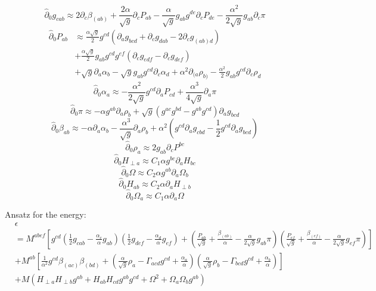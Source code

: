 \documentclass{article}
\begin{document}
\[
{\hat \partial}_{0}g_{cab} \approx 2\partial_{c}\beta_{(ab)} + \frac{2\alpha}{\sqrt{g}}\partial_{c}P_{ab} - \frac{\alpha}{\sqrt{g}}g_{ab}g^{de}\partial_{c}P_{de} - \frac{\alpha^2}{2\sqrt{g}}g_{ab}\partial_{c}\pi
\]
\begin{align*}
{\hat \partial}_{0}P_{ab} & \approx \frac{\alpha\sqrt{g}}{2}g^{cd}\left(\partial_{a}g_{bcd} + \partial_{c}g_{dab} - 2\partial_{c}g_{(ab)d}\right)\\
& + \frac{\alpha\sqrt{g}}{2}g_{ab}g^{cd}g^{ef}\left(\partial_{c}g_{edf} - \partial_{c}g_{def}\right)\\
& + \sqrt{g}\partial_{a}\alpha_{b} - \sqrt{g}g_{ab}g^{cd}\partial_{c}\alpha_{d} + \alpha^{2}\partial_{(a}\rho_{b)} - \frac{\alpha^2}{2}g_{ab}g^{cd}\partial_{c}\rho_{d} 
\end{align*}
\[
{\hat \partial}_{0}\alpha_{a} \approx - \frac{\alpha^{2}}{2\sqrt{g}}g^{cd}\partial_{a}P_{cd} + \frac{\alpha^{3}}{4\sqrt{g}}\partial_{a}\pi
\]
\[
{\hat \partial}_{0}\pi \approx -\alpha g^{ab}\partial_{a}\rho_{b} + \sqrt{g}\left(g^{ac}g^{bd} - g^{ab}g^{cd}\right)\partial_{a}g_{bcd}
\]
\[
{\hat \partial}_{0}\beta_{ab} \approx - \alpha \partial_{a}\alpha_{b} - \frac{\alpha^{3}}{\sqrt{g}}\partial_{a}\rho_{b} + \alpha^{2}\left(g^{cd}\partial_{a}g_{cbd} - \frac{1}{2}g^{cd}\partial_{a}g_{bcd}\right)
\]
\[
{\hat \partial}_{0}\rho_{a} \approx 2g_{ab}\partial_{c}P^{bc}
\]
\[
{\hat \partial}_{0}H_{\perp a} \approx C_{1}\alpha g^{bc}\partial_{a}H_{bc}
\]
\[
{\hat \partial}_{0}\Omega \approx C_{2}\alpha g^{ab}\partial_{a}\Omega_{b}
\]
\[
{\hat \partial}_{0}H_{ab} \approx C_{2}\alpha \partial_{a}H_{\perp b}
\]
\[
{\hat \partial}_{0}\Omega_{a} \approx C_{1}\alpha \partial_{a}\Omega
\]

Ansatz for the energy: 
\begin{align*}
& \epsilon \\
& = M^{abef}\left[g^{cd}\left(\frac{1}{2}g_{cab} - \frac{\alpha_{c}}{\alpha}g_{ab}\right)\left(\frac{1}{2}g_{def} - \frac{\alpha_{d}}{\alpha}g_{ef}\right) + \left(\frac{P_{ab}}{\sqrt{g}} + \frac{\beta_{(ab)}}{\alpha} - \frac{\alpha}{2\sqrt{g}}g_{ab}\pi \right)\left(\frac{P_{ef}}{\sqrt{g}} + \frac{\beta_{(ef)}}{\alpha} - \frac{\alpha}{2\sqrt{g}}g_{ef}\pi\right)\right]\\
& + M^{ab}\left[\frac{1}{\alpha^{2}}g^{cd}\beta_{(ac)}\beta_{(bd)} + \left(\frac{\alpha}{\sqrt{g}}\rho_{a} - \Gamma_{acd}g^{cd} + \frac{\alpha_{a}}{\alpha}\right)\left(\frac{\alpha}{\sqrt{g}}\rho_{b} - \Gamma_{bcd}g^{cd} + \frac{\alpha_{b}}{\alpha}\right)\right]\\
& + M\left(H_{\perp a}H_{\perp b}g^{ab} + H_{ab}H_{cd}g^{ab}g^{cd} + \Omega^{2} + \Omega_{a}\Omega_{b}g^{ab}\right)
\end{align*}
\end{document}
